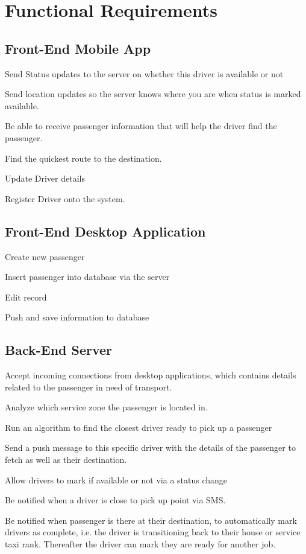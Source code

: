 \documentclass[a4paper,12pt]{article}
\begin{document}
\pagebreak
\section{Functional Requirements}
\subsection{Front-End Mobile App}
\begin{description}
\setlength\itemsep{0em}
\item Send Status updates to the server on whether this driver is available or not
\item Send location updates so the server knows where you are when status is marked available.
\item Be able to receive passenger information that will help the driver find the passenger.
\item Find the quickest route to the destination.
\item Update Driver details
\item Register Driver onto the system.
\end{description}
\subsection{Front-End Desktop Application}
\begin{description}
\setlength\itemsep{0em}
\item Create new passenger
\item Insert passenger into database via the server
\item Edit record
\item Push and save information to database
\end{description}
\subsection{Back-End Server}
\begin{description}
\setlength\itemsep{0em}
\item Accept incoming connections from desktop applications, which contains details related to the passenger in need of transport.
\item Analyze which service zone the passenger is located in.
\item Run an algorithm to find the closest driver ready to pick up a passenger
\item Send a push message to this specific driver with the details of the passenger to fetch as well as their destination.
\item Allow drivers to mark if available or not via a status change
\item Be notified when a driver is close to pick up point via SMS.
\item Be notified when passenger is there at their destination, to automatically mark drivers as complete, i.e. the driver is transitioning back to their house or service taxi rank. Thereafter the driver can mark they are ready for another job.
\end{description}
\pagebreak
\end{document}
